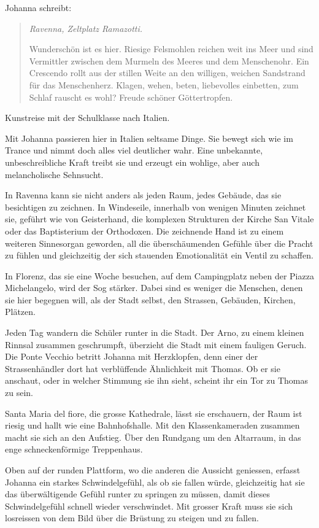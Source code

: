 \documentclass[10pt,titlepage,a5paper]{book}
\newenvironment{tg}{\begin{quote}\em}{\end{quote}}
\begin{document}
	
	

Johanna schreibt:


\begin{tg}
Ravenna, Zeltplatz Ramazotti.

Wunderschön ist es hier. Riesige Felsmohlen reichen weit ins Meer und sind Vermittler zwischen dem Murmeln des Meeres und dem Menschenohr. Ein Crescendo rollt aus der stillen Weite an den willigen, weichen Sandstrand für das Menschenherz. Klagen, wehen, beten, liebevolles einbetten, zum Schlaf rauscht es wohl? Freude schöner Göttertropfen.
\end{tg}


Kunstreise mit der Schulklasse nach Italien.

Mit Johanna passieren hier in Italien seltsame Dinge. Sie bewegt sich wie im Trance und nimmt doch alles viel deutlicher wahr. Eine unbekannte, unbeschreibliche Kraft treibt sie und erzeugt ein wohlige, aber auch melancholische Sehnsucht.

In Ravenna kann sie nicht anders als jeden Raum, jedes Gebäude, das sie besichtigen zu zeichnen. In Windeseile, innerhalb von wenigen Minuten zeichnet sie, geführt wie von Geisterhand, die komplexen Strukturen der Kirche San Vitale oder das Baptisterium der Orthodoxen. Die zeichnende Hand ist zu einem weiteren Sinnesorgan geworden, all die überschäumenden Gefühle über die Pracht zu fühlen und gleichzeitig der sich stauenden Emotionalität  ein Ventil zu schaffen.

In Florenz, das sie eine Woche besuchen, auf dem Campingplatz neben der Piazza Michelangelo, wird der Sog stärker. Dabei sind es weniger die Menschen, denen sie hier begegnen will, als der Stadt selbst, den Strassen, Gebäuden, Kirchen, Plätzen.

Jeden Tag wandern die Schüler runter in die Stadt. Der Arno, zu einem kleinen Rinnsal zusammen geschrumpft,  überzieht die Stadt mit einem fauligen Geruch. Die Ponte Vecchio betritt Johanna mit Herzklopfen, denn einer der Strassenhändler dort hat verblüffende Ähnlichkeit mit Thomas. Ob er sie anschaut, oder in welcher Stimmung sie ihn sieht, scheint ihr ein Tor zu Thomas zu sein.

Santa Maria del fiore, die grosse Kathedrale, lässt sie erschauern, der Raum ist riesig und hallt wie eine Bahnhofshalle. Mit den Klassenkameraden zusammen macht sie sich an den Aufstieg. Über den Rundgang um den Altarraum, in das enge schneckenförmige Treppenhaus. 

Oben auf der runden Plattform, wo die anderen die Aussicht geniessen, erfasst Johanna ein starkes Schwindelgefühl, als ob sie fallen würde, gleichzeitig hat sie das überwältigende Gefühl runter zu springen zu müssen, damit dieses Schwindelgefühl schnell wieder verschwindet. Mit grosser Kraft muss sie sich losreissen von dem Bild über die Brüstung zu steigen und zu fallen. 
\end{document}
